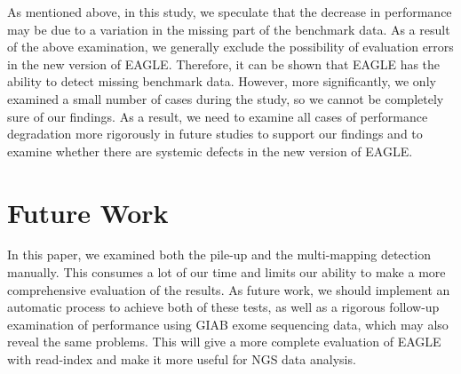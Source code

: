 \documentclass[PhD]{PHlab-thesis}
\begin{document}
As mentioned above, in this study, we speculate that the decrease in performance may be due to a variation in the missing part of the benchmark data. As a result of the above examination, we generally exclude the possibility of evaluation errors in the new version of EAGLE. Therefore, it can be shown that EAGLE has the ability to detect missing benchmark data. However, more significantly, we only examined a small number of cases during the study, so we cannot be completely sure of our findings. As a result, we need to examine all cases of performance degradation more rigorously in future studies to support our findings and to examine whether there are systemic defects in the new version of EAGLE.
\section{Future Work}
In this paper, we examined both the pile-up and the multi-mapping detection manually. This consumes a lot of our time and limits our ability to make a more comprehensive evaluation of the results. As future work, we should implement an automatic process to achieve both of these tests, as well as a rigorous follow-up examination of performance using GIAB exome sequencing data, which may also reveal the same problems. This will give a more complete evaluation of EAGLE with read-index and make it more useful for NGS data analysis.

\newpage
{}
\printbibliography
\end{document}
